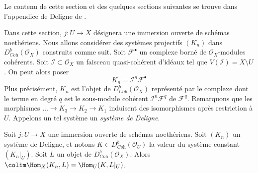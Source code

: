 \noindent
Le contenu de cette section et des quelques sections suivantes se trouve dans l'appendice de Deligne de \cite{RD}.

\medskip\noindent
Dans cette section, $j : U \to X$ désignera une immersion ouverte de schémas noethériens. Nous allons considérer des systèmes projectifs $(K_n)$ dans $D^b_{\textit{Coh}}(\mathcal{O}_X)$ construits comme suit. Soit $\mathcal{F}^\bullet$ un complexe borné de $\mathcal{O}_X$-modules cohérents. Soit $\mathcal{I} \subset \mathcal{O}_X$ un faisceau quasi-cohérent d'idéaux tel que $V(\mathcal{I}) = X \setminus U$. On peut alors poser
$$
K_n = \mathcal{I}^n\mathcal{F}^\bullet
$$
Plus précisément, $K_n$ est l'objet de $D^b_{\textit{Coh}}(\mathcal{O}_X)$ représenté par le complexe dont le terme en degré $q$ est le sous-module cohérent $\mathcal{I}^n\mathcal{F}^q$ de $\mathcal{F}^q$. Remarquons que les morphismes $\ldots \to K_3 \to K_2 \to K_1$ induisent des isomorphismes après restriction à $U$. Appelons un tel système un {\it système de Deligne}.

\begin{lemma}
\label{lemma-lift-map}
Soit $j : U \to X$ une immersion ouverte de schémas noethériens. Soit $(K_n)$ un système de Deligne, et notons $K \in D^b_{\textit{Coh}}(\mathcal{O}_U)$ la valeur du système constant $(K_n|_U)$. Soit $L$ un objet de $D^b_{\textit{Coh}}(\mathcal{O}_X)$. Alors $\colim \Hom_X(K_n, L) = \Hom_U(K, L|_U)$.
\end{lemma}

